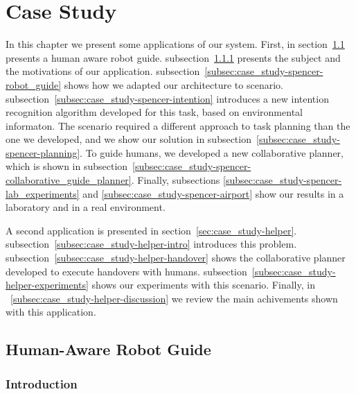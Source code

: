 
\chapter{Case Study} %

\label{chapter:case_study} %




In this chapter we present some applications of our system. First, in section~\ref{sec:case_study-spencer} presents a human aware robot guide. subsection~\ref{subsec:case_study-spencer-intro} presents the subject and the motivations of our application. subsection~\ref{subsec:case_study-spencer-robot_guide} shows how we adapted our architecture to scenario. subsection~\ref{subsec:case_study-spencer-intention} introduces a new intention recognition algorithm developed for this task, based on environmental informaton. The scenario required a different approach to task planning than the one we developed, and we show our solution in subsection~\ref{subsec:case_study-spencer-planning}. To guide humans, we developed a new collaborative planner, which is shown in subsection~\ref{subsec:case_study-spencer-collaborative_guide_planner}. Finally, subsections \ref{subsec:case_study-spencer-lab_experiments} and \ref{subsec:case_study-spencer-airport} show our results in a laboratory and in a real environment.

A second application is presented in section~\ref{sec:case_study-helper}. subsection~\ref{subsec:case_study-helper-intro} introduces this problem. subsection~\ref{subsec:case_study-helper-handover} shows the collaborative planner developed to execute handovers with humans. subsection~\ref{subsec:case_study-helper-experiments} shows our experiments with this scenario. Finally, in ~\ref{subsec:case_study-helper-discussion} we review the main achivements shown with this application. 

\section{Human-Aware Robot Guide}
\label{sec:case_study-spencer}
\subsection{Introduction}
\label{subsec:case_study-spencer-intro}
